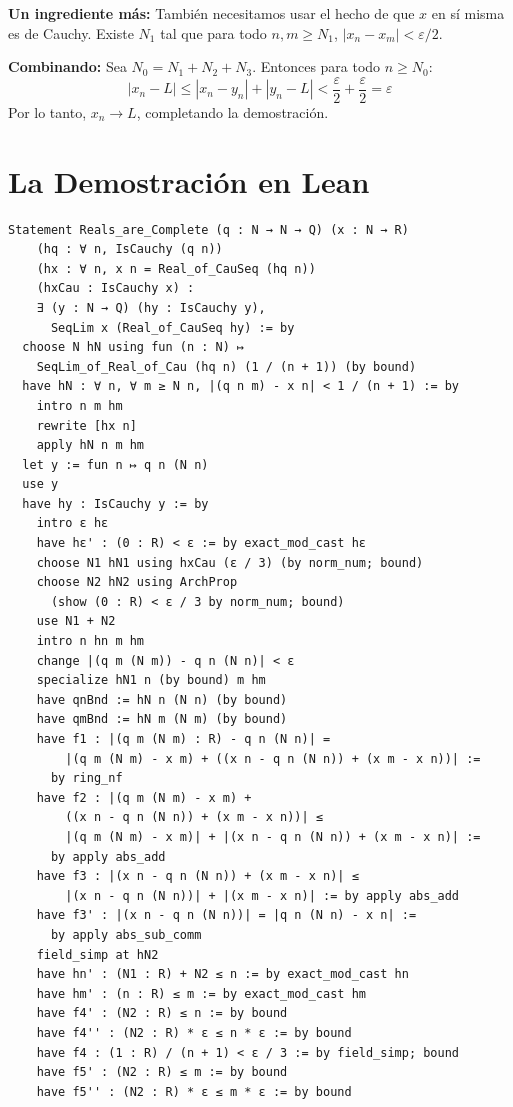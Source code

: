 \textbf{Un ingrediente más:} También necesitamos usar el hecho de que $x$ en sí
misma es de Cauchy. Existe $N_1$ tal que para todo $n, m \geq N_1$,
$|x_n - x_m| < \varepsilon/2$.

\textbf{Combinando:} Sea $N_0 = N_1 + N_2 + N_3$. Entonces para todo $n \geq N_0$:
\[
  |x_n - L| \leq |x_n - y_n| + |y_n - L| < \frac{\varepsilon}{2} + \frac{\varepsilon}{2} = \varepsilon
\]
Por lo tanto, $x_n \to L$, completando la demostración.

\section{La Demostración en Lean}

\begin{verbatim}
Statement Reals_are_Complete (q : N → N → Q) (x : N → R)
    (hq : ∀ n, IsCauchy (q n))
    (hx : ∀ n, x n = Real_of_CauSeq (hq n))
    (hxCau : IsCauchy x) :
    ∃ (y : N → Q) (hy : IsCauchy y),
      SeqLim x (Real_of_CauSeq hy) := by
  choose N hN using fun (n : N) ↦
    SeqLim_of_Real_of_Cau (hq n) (1 / (n + 1)) (by bound)
  have hN : ∀ n, ∀ m ≥ N n, |(q n m) - x n| < 1 / (n + 1) := by
    intro n m hm
    rewrite [hx n]
    apply hN n m hm
  let y := fun n ↦ q n (N n)
  use y
  have hy : IsCauchy y := by
    intro ε hε
    have hε' : (0 : R) < ε := by exact_mod_cast hε
    choose N1 hN1 using hxCau (ε / 3) (by norm_num; bound)
    choose N2 hN2 using ArchProp
      (show (0 : R) < ε / 3 by norm_num; bound)
    use N1 + N2
    intro n hn m hm
    change |(q m (N m)) - q n (N n)| < ε
    specialize hN1 n (by bound) m hm
    have qnBnd := hN n (N n) (by bound)
    have qmBnd := hN m (N m) (by bound)
    have f1 : |(q m (N m) : R) - q n (N n)| =
        |(q m (N m) - x m) + ((x n - q n (N n)) + (x m - x n))| :=
      by ring_nf
    have f2 : |(q m (N m) - x m) +
        ((x n - q n (N n)) + (x m - x n))| ≤
        |(q m (N m) - x m)| + |(x n - q n (N n)) + (x m - x n)| :=
      by apply abs_add
    have f3 : |(x n - q n (N n)) + (x m - x n)| ≤
        |(x n - q n (N n))| + |(x m - x n)| := by apply abs_add
    have f3' : |(x n - q n (N n))| = |q n (N n) - x n| :=
      by apply abs_sub_comm
    field_simp at hN2
    have hn' : (N1 : R) + N2 ≤ n := by exact_mod_cast hn
    have hm' : (n : R) ≤ m := by exact_mod_cast hm
    have f4' : (N2 : R) ≤ n := by bound
    have f4'' : (N2 : R) * ε ≤ n * ε := by bound
    have f4 : (1 : R) / (n + 1) < ε / 3 := by field_simp; bound
    have f5' : (N2 : R) ≤ m := by bound
    have f5'' : (N2 : R) * ε ≤ m * ε := by bound

\end{verbatim}
